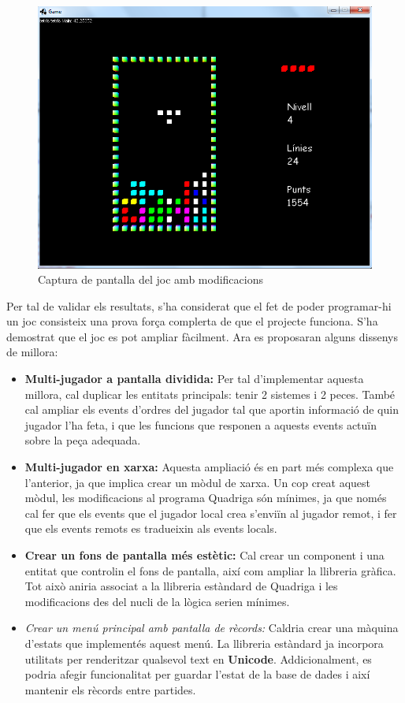   \begin{figure}
    \centering
    \includegraphics[width=0.5\linewidth]{./img/ImatgePecaSeguent.png}
    \caption{Captura de pantalla del joc amb modificacions \label{fig:ImatgePecaSeguent}}
  \end{figure}

  Per tal de validar els resultats, s'ha considerat que el fet de poder programar-hi un joc consisteix una prova força complerta de que el projecte funciona. S'ha demostrat que el joc es pot ampliar fàcilment. Ara es proposaran alguns dissenys de millora:
  
  \begin{itemize}
    \item {\bf Multi-jugador a pantalla dividida:} Per tal d'implementar aquesta millora, cal duplicar les entitats principals: tenir 2 sistemes i 2 peces. També cal ampliar els events d'ordres del jugador tal que aportin informació de quin jugador l'ha feta, i que les funcions que responen a aquests events actuïn sobre la peça adequada.
    
    \item {\bf Multi-jugador en xarxa:} Aquesta ampliació és en part més complexa que l'anterior, ja que implica crear un mòdul de xarxa. Un cop creat aquest mòdul, les modificacions al programa Quadriga són mínimes, ja que només cal fer que els events que el jugador local crea s'enviïn al jugador remot, i fer que els events remots es tradueixin als events locals.
    
    \item {\bf Crear un fons de pantalla més estètic:} Cal crear un component i una entitat que controlin el fons de pantalla, així com ampliar la llibreria gràfica. Tot això aniria associat a la llibreria estàndard de Quadriga i les modificacions des del nucli de la lògica serien mínimes.
    
    \item {\em Crear un menú principal amb pantalla de rècords:} Caldria crear una màquina d'estats que implementés aquest menú. La llibreria estàndard ja incorpora utilitats per renderitzar qualsevol text en {\bf Unicode}. Addicionalment, es podria afegir funcionalitat per guardar l'estat de la base de dades i així mantenir els rècords entre partides.
  \end{itemize}

  